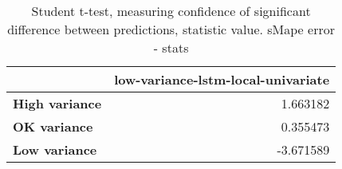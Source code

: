\begin{table}[h]
\centering
\caption{Student t-test, measuring confidence of significant difference between predictions, statistic value. sMape error - stats}
\label{table:ttest-stats-variance-experiments-sMAPE}
\begin{tabular}{lr}
\toprule
{} &  low-variance-lstm-local-univariate \\
\midrule
\textbf{High variance} &                            1.663182 \\
\textbf{OK variance  } &                            0.355473 \\
\textbf{Low variance } &                           -3.671589 \\
\bottomrule
\end{tabular}
\end{table}
